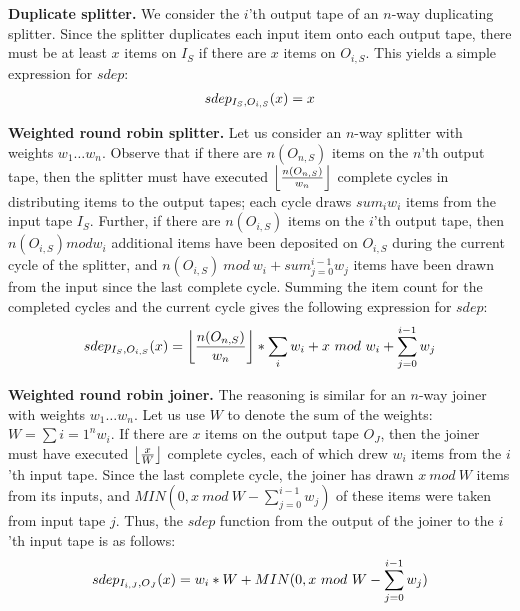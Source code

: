 {\bf Duplicate splitter.}  We consider the $i$'th output tape of an
$n$-way duplicating splitter.  Since the splitter duplicates each
input item onto each output tape, there must be at least $x$ items on
$I_S$ if there are $x$ items on $O_{i,S}$.  This yields a simple
expression for $sdep$:
\begin{align*}
sdep_{I_S, O_{i,S}}(x) = x
\end{align*}

{\bf Weighted round robin splitter.}  Let us consider an $n$-way
splitter with weights $w_1 \dots w_n$.  Observe that if there are
$n(O_{n,S})$ items on the $n$'th output tape, then the splitter must have
executed $\left\lfloor\frac{n(O_{n,S})}{w_n}\right\rfloor$ complete cycles in distributing items
to the output tapes; each cycle draws $sum_{i}{w_i}$ items from the
input tape $I_S$.  Further, if there are $n(O_{i,S})$ items on the $i$'th
output tape, then $n(O_{i,S}) mod w_i$ additional items have been
deposited on $O_{i,S}$ during the current cycle of the splitter, and
$n(O_{i,S})~mod~w_i + sum_{j=0}^{i-1}{w_j}$ items have been drawn from
the input since the last complete cycle.  Summing the item count for
the completed cycles and the current cycle gives the following
expression for $sdep$:
\begin{align*}
sdep_{I_S, O_{i,S}}(x) = \left\lfloor\frac{n(O_{n,S})}{w_n}\right\rfloor * \sum_{i}{w_i} + x~mod~w_i +
\sum_{j=0}^{i-1}{w_j}
\end{align*}

{\bf Weighted round robin joiner.}  The reasoning is similar for an
$n$-way joiner with weights $w_1 \dots w_n$.  Let us use $W$ to denote
the sum of the weights: $W = \sum{i=1}^{n}{w_i}$.  If there are $x$
items on the output tape $O_J$, then the joiner must have executed
$\left\lfloor\frac{x}{W}\right\rfloor$ complete cycles, each of which drew $w_i$ items from
the $i$'th input tape.  Since the last complete cycle, the joiner has
drawn $x~mod~W$ items from its inputs, and $MIN(0, x~mod~W -
\sum_{j=0}^{i-1}{w_j})$ of these items were taken from input tape $j$.
Thus, the $sdep$ function from the output of the joiner to the $i$'th
input tape is as follows:
\begin{align*}
sdep_{I_{i,J}, O_J}(x) = w_i * W + MIN(0, x~mod~W - \sum_{j=0}^{i-1}{w_j})
\end{align*}

